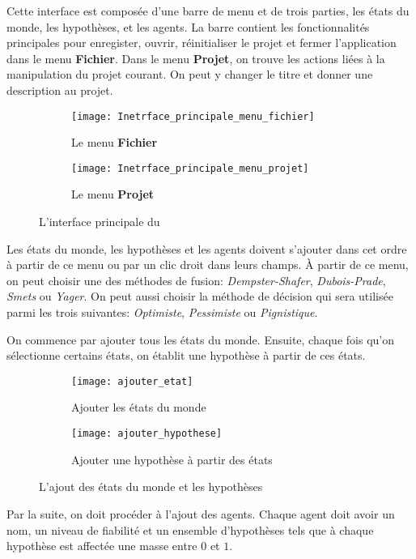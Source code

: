 Cette interface est composée d'une barre de menu et de trois parties, les états
du monde, les hypothèses, et les agents. La barre contient les fonctionnalités principales
pour enregister, ouvrir, réinitialiser le projet et fermer l'application dans le menu
\textbf{Fichier}. Dans le menu \textbf{Projet}, on trouve les actions liées à la manipulation
du projet courant. On peut y changer le titre et donner une description au projet.\\[1em]

\begin{figure}[H]
\begin{subfigure}{0.49\textwidth}
\texttt{[image: Inetrface\_principale\_menu\_fichier]}
\caption{Le menu \textbf{Fichier}}
\end{subfigure}
\hfill
\begin{subfigure}{0.49\textwidth}
\texttt{[image: Inetrface\_principale\_menu\_projet]}
\caption{Le menu \textbf{Projet}}
\end{subfigure}
\caption{L'interface principale du \appname}
\end{figure}

Les états du monde, les hypothèses et les agents doivent s'ajouter dans cet ordre à partir
de ce menu ou par un clic droit dans leurs champs. \`A partir de ce menu, on peut choisir une
des méthodes de fusion: \textit{Dempster-Shafer}, \textit{Dubois-Prade}, \textit{Smets} ou
\textit{Yager}. On peut aussi choisir la méthode de décision qui sera utilisée parmi les trois
suivantes: \textit{Optimiste}, \textit{Pessimiste} ou \textit{Pignistique}.

On commence par ajouter tous les états du monde. Ensuite, chaque fois qu'on sélectionne certains
états, on établit une hypothèse à partir de ces états.\\[1em]

\begin{figure}[H]
\begin{subfigure}{0.49\textwidth}
\texttt{[image: ajouter\_etat]}
\caption{Ajouter les états du monde}
\end{subfigure}
\hfill
\begin{subfigure}{0.49\textwidth}
\texttt{[image: ajouter\_hypothese]}
\caption{Ajouter une hypothèse à partir des états}
\end{subfigure}
\caption{L'ajout des états du monde et les hypothèses}
\end{figure}

Par la suite, on doit procéder à l'ajout des agents. Chaque agent doit avoir un nom, un niveau de
fiabilité et un ensemble d'hypothèses tels que à chaque hypothèse est affectée une masse entre
$0$ et $1$.\\[1em]

